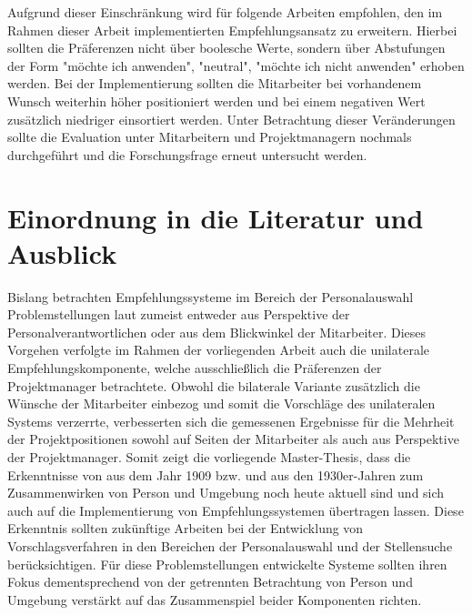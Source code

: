 Aufgrund dieser Einschränkung wird für folgende Arbeiten empfohlen, den im Rahmen dieser Arbeit implementierten Empfehlungsansatz zu erweitern. Hierbei sollten die Präferenzen nicht über boolesche Werte, sondern über Abstufungen der Form "möchte ich anwenden", "neutral", "möchte ich nicht anwenden" erhoben werden. Bei der Implementierung sollten die Mitarbeiter bei vorhandenem Wunsch weiterhin höher positioniert werden und bei einem negativen Wert zusätzlich niedriger einsortiert werden. Unter Betrachtung dieser Veränderungen sollte die Evaluation unter Mitarbeitern und Projektmanagern nochmals durchgeführt und die Forschungsfrage erneut untersucht werden.

\section{Einordnung in die Literatur und Ausblick}
\label{ch:diskussion:einordnung}
Bislang betrachten Empfehlungssysteme im Bereich der Personalauswahl Problemstellungen laut \textcite[S. 1ff.]{malinowski:2006} zumeist entweder aus Perspektive der Personalverantwortlichen oder aus dem Blickwinkel der Mitarbeiter. Dieses Vorgehen verfolgte im Rahmen der vorliegenden Arbeit auch die unilaterale Empfehlungskomponente, welche ausschließlich die Präferenzen der Projektmanager betrachtete. Obwohl die bilaterale Variante zusätzlich die Wünsche der Mitarbeiter einbezog und somit die Vorschläge des unilateralen Systems verzerrte, verbesserten sich die gemessenen Ergebnisse für die Mehrheit der Projektpositionen sowohl auf Seiten der Mitarbeiter als auch aus Perspektive der Projektmanager. Somit zeigt die vorliegende Master-Thesis, dass die Erkenntnisse von \textcite[S. 5ff.]{parsons:1909} aus dem Jahr 1909 bzw. \textcite[S. 11f.]{lewin:1936} und \textcite[S. 38ff.]{murray:1938} aus den 1930er-Jahren zum Zusammenwirken von Person und Umgebung noch heute aktuell sind und sich auch auf die Implementierung von Empfehlungssystemen übertragen lassen. Diese Erkenntnis sollten zukünftige Arbeiten bei der Entwicklung von Vorschlagsverfahren in den Bereichen der Personalauswahl und der Stellensuche berücksichtigen. Für diese Problemstellungen entwickelte Systeme sollten ihren Fokus dementsprechend von der getrennten Betrachtung von Person und Umgebung verstärkt auf das Zusammenspiel beider Komponenten richten. 

